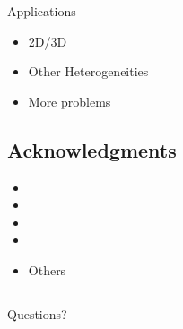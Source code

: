 
\begin{frame}[t]{Applications}
    
    \begin{itemize}
        \item 2D/3D
        \item Other Heterogeneities
        \item More problems
    \end{itemize}

\end{frame}


\subsection{Acknowledgments}
\begin{frame}

\footnotesize
\begin{itemize}
    \item 
    \item 
    \item 
    \item 
\end{itemize}

\end{frame}


\begin{frame}
    
    \begin{itemize}
        \item Others
    \end{itemize}
    
\end{frame}


\subsection*{ }
\begin{frame}
    
\vfill
\begin{center}
    \Large Questions?
\end{center}
\vfill

\end{frame}